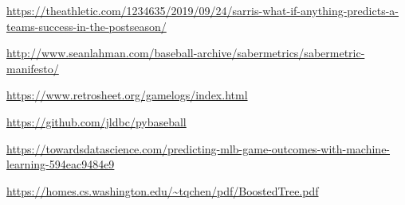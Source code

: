 \documentclass[12pt,onecolumn]{article}
\begin{document}
\noindent
\url{https://theathletic.com/1234635/2019/09/24/sarris-what-if-anything-predicts-a-teams-success-in-the-postseason/} \vspace*{4mm}

\noindent
\url{http://www.seanlahman.com/baseball-archive/sabermetrics/sabermetric-manifesto/} \vspace*{4mm}

\noindent
\url{https://www.retrosheet.org/gamelogs/index.html} \vspace*{4mm}

\noindent
\url{https://github.com/jldbc/pybaseball} \vspace*{4mm}

\noindent
\url{https://towardsdatascience.com/predicting-mlb-game-outcomes-with-machine-learning-594eac9484e9} \vspace*{4mm}

\noindent
\url{https://homes.cs.washington.edu/~tqchen/pdf/BoostedTree.pdf}
\end{document}
